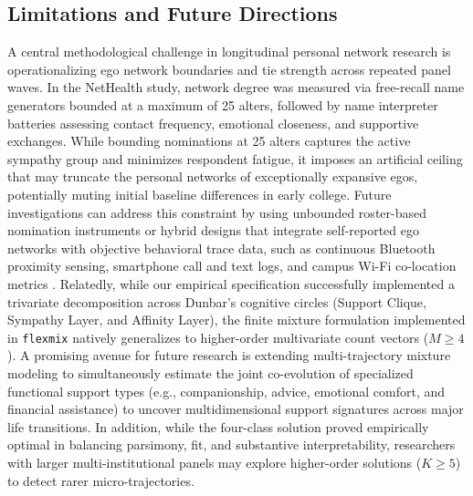 \documentclass[12pt]{article}
\begin{document}
\subsection{Limitations and Future Directions}

A central methodological challenge in longitudinal personal network research is operationalizing ego network boundaries and tie strength across repeated panel waves. In the NetHealth study, network degree was measured via free-recall name generators bounded at a maximum of 25 alters, followed by name interpreter batteries assessing contact frequency, emotional closeness, and supportive exchanges. While bounding nominations at 25 alters captures the active sympathy group and minimizes respondent fatigue, it imposes an artificial ceiling that may truncate the personal networks of exceptionally expansive egos, potentially muting initial baseline differences in early college. Future investigations can address this constraint by using unbounded roster-based nomination instruments or hybrid designs that integrate self-reported ego networks with objective behavioral trace data, such as continuous Bluetooth proximity sensing, smartphone call and text logs, and campus Wi-Fi co-location metrics \citep{centellegher2017personality, sepulvado2020predicting}. Relatedly, while our empirical specification successfully implemented a trivariate decomposition across Dunbar's cognitive circles (Support Clique, Sympathy Layer, and Affinity Layer), the finite mixture formulation implemented in \texttt{flexmix} natively generalizes to higher-order multivariate count vectors ($M \ge 4$). A promising avenue for future research is extending multi-trajectory mixture modeling to simultaneously estimate the joint co-evolution of specialized functional support types (e.g., companionship, advice, emotional comfort, and financial assistance) to uncover multidimensional support signatures across major life transitions. In addition, while the four-class solution proved empirically optimal in balancing parsimony, fit, and substantive interpretability, researchers with larger multi-institutional panels may explore higher-order solutions ($K \ge 5$) to detect rarer micro-trajectories.
\end{document}
